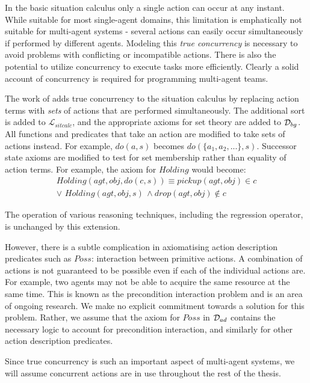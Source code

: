 In the basic situation calculus only a single action can occur at
any instant. While suitable for most single-agent domains, this limitation
is emphatically not suitable for multi-agent systems - several actions
can easily occur simultaneously if performed by different agents.
Modeling this \emph{true concurrency} is necessary to avoid problems
with conflicting or incompatible actions. There is also the potential
to utilize concurrency to execute tasks more efficiently. Clearly
a solid account of concurrency is required for programming multi-agent
teams.

The work of \citep{lin92sc_conc,reiter96sc_nat_conc} adds true concurrency
to the situation calculus by replacing action terms with \emph{sets}
of actions that are performed simultaneously. The additional sort
 is added to $\mathcal{L}_{sitcalc}$, and the appropriate
axioms for set theory are added to $\mathcal{D}_{bg}$. All functions and
predicates that take an action are modified to take sets of actions
instead. For example, $do(a,s)$ becomes $do(\{a_{1},a_{2},...\},s)$.
Successor state axioms are modified to test for set membership rather
than equality of action terms. For example, the axiom for $Holding$
would become:\begin{multline*}
Holding(agt,obj,do(c,s))\equiv pickup(agt,obj)\in c\\
\vee\,\, Holding(agt,obj,s)\,\wedge drop(agt,obj)\not\in c\end{multline*}


The operation of various reasoning techniques, including the regression
operator, is unchanged by this extension.

However, there is a subtle complication in axiomatising action description
predicates such as $Poss$: interaction between primitive actions.
A combination of actions is not guaranteed to be possible even if
each of the individual actions are. For example, two agents may not
be able to acquire the same resource at the same time. This is known
as the precondition interaction problem \citep{pinto94temporal} and
is an area of ongoing research. We make no explicit commitment towards
a solution for this problem. Rather, we assume that the axiom for
$Poss$ in $\mathcal{D}_{ad}$ contains the necessary logic to account for
precondition interaction, and similarly for other action description
predicates.

Since true concurrency is such an important aspect of multi-agent
systems, we will assume concurrent actions are in use throughout the
rest of the thesis.


